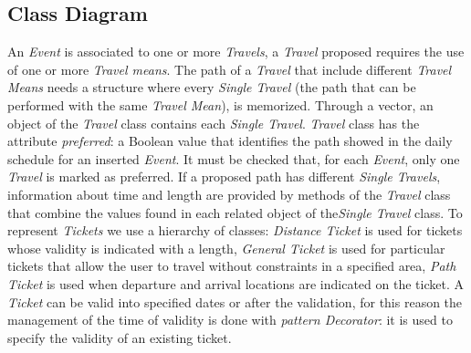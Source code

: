 \subsection{Class Diagram}
\noindent{}
\newline
An \textit{Event} is associated to one or more \textit{Travels}, a \textit{Travel} proposed requires the use of one or more \textit{Travel means}. The path of a \textit{Travel} that include different \textit{Travel Means} needs a structure where every \textit{Single Travel} (the path that can be performed with the same \textit{Travel Mean}), is memorized. Through a vector, an object of the \textit{Travel} class contains each \textit{Single Travel}.
\newline
\newline
\textit{Travel} class has the attribute \textit{preferred}: a Boolean value that identifies the path showed in the daily schedule for an inserted \textit{Event}. It must be checked that, for each \textit{Event}, only one \textit{Travel} is marked as preferred.
\newline
If a proposed path has different \textit{Single Travels}, information about time and length are provided by methods of the \textit{Travel} class that combine the values found in each related object of the\textit{Single Travel} class.
\newline
\newline
To represent \textit{Tickets} we use a hierarchy of classes: \textit{Distance Ticket} is used for tickets whose validity is indicated with a length, \textit{General Ticket} is used for particular tickets that allow the user to travel without constraints in a specified area, \textit{Path Ticket} is used when departure and arrival locations are indicated on the ticket. 
\newline
A \textit{Ticket} can be valid into specified dates or after the validation, for this reason the management of the time of validity is done with \textit{pattern Decorator}: it is used to specify the validity of an existing ticket.
